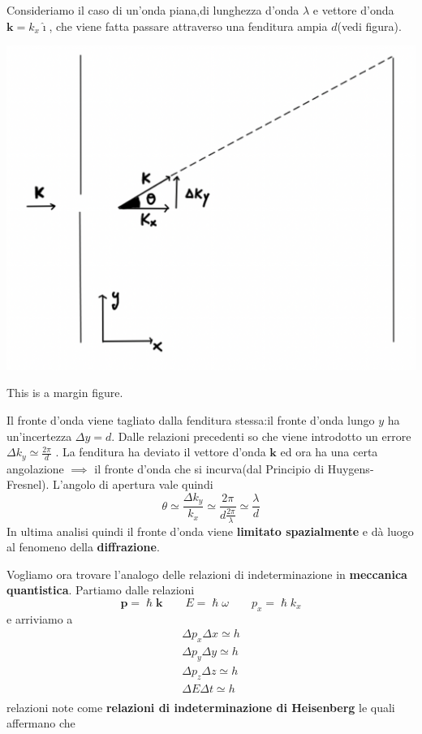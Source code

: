 Consideriamo il caso di un'onda piana,di lunghezza d'onda \(\lambda\) e
vettore d'onda \(\bm{k} = k_x \hat{\imath}\), che viene fatta passare
attraverso una fenditura ampia \(d\)(vedi figura).

\begin{marginfigure}
    \includegraphics{figs/wave-electron-experiment}
    \caption{This is a margin figure.}
    \label{fig:wave-electron-experiment}
\end{marginfigure}

Il fronte d'onda viene tagliato dalla fenditura stessa:il fronte d'onda
lungo \(y\) ha un'incertezza \(\Delta y = d\).
Dalle relazioni
precedenti so che viene introdotto un errore
\(\Delta k_{y} \simeq\frac{2\pi}{d}\) .
La fenditura ha deviato il
vettore d'onda \(\bm{k}\) ed ora ha una certa angolazione \(\implies\)
il fronte d'onda che si incurva(dal Principio di Huygens-Fresnel).
L'angolo di apertura vale quindi \[
                                     \theta \simeq\frac{\Delta k_{y}}{k_{x}} \simeq \frac{2\pi}{d  \frac{2\pi}{\lambda}} \simeq\frac{\lambda}{d}
\] In ultima analisi quindi il fronte d'onda viene \textbf{limitato
spazialmente} e dà luogo al fenomeno della \textbf{diffrazione}.

Vogliamo ora trovare l'analogo delle relazioni di indeterminazione in
\textbf{meccanica quantistica}.
Partiamo dalle relazioni \[
                                                             \bm{p} = \hslash \bm{k} \qquad E = \hslash \omega \qquad p_{x} = \hslash k_{x}
\] e arriviamo a \begin{gather*}
    \Delta p_{x} \Delta x \simeq h\\
    \Delta p_{y} \Delta y \simeq h\\
    \Delta p_{z} \Delta z \simeq h\\
    \Delta E \Delta t \simeq h\\
\end{gather*} relazioni note come \textbf{relazioni di indeterminazione di
Heisenberg} le quali affermano che

